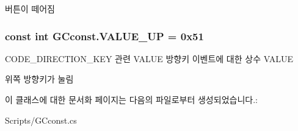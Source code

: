 버튼이 떼어짐 \hypertarget{class_g_cconst_a5cc16bbe1d7540c883cc97a9dabbda20}{}
\subsubsection[{V\+A\+L\+U\+E\+\_\+\+U\+P}]{\setlength{\rightskip}{0pt plus 5cm}const int G\+Cconst.\+V\+A\+L\+U\+E\+\_\+\+U\+P = 0x51}\label{class_g_cconst_a5cc16bbe1d7540c883cc97a9dabbda20}
C\+O\+D\+E\+\_\+\+D\+I\+R\+E\+C\+T\+I\+O\+N\+\_\+\+K\+E\+Y 관련 V\+A\+L\+U\+E 방향키 이벤트에 대한 상수 V\+A\+L\+U\+E

위쪽 방향키가 눌림 

이 클래스에 대한 문서화 페이지는 다음의 파일로부터 생성되었습니다.\+:\begin{DoxyCompactItemize}
\item 
Scripts/G\+Cconst.\+cs\end{DoxyCompactItemize}
